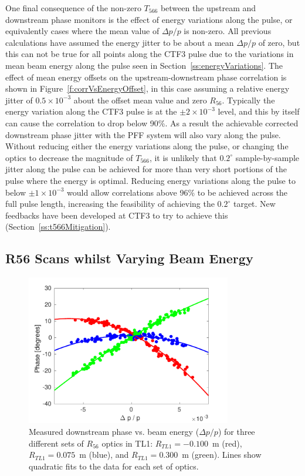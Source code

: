 One final consequence of the non-zero \(T_{566}\) between the upstream and downstream phase monitors is the effect of energy variations along the pulse, or equivalently cases where the mean value of \(\Delta p/p\) is non-zero. All previous calculations have assumed the energy jitter to be about a mean \(\Delta p / p\) of zero, but this can not be true for all points along the CTF3 pulse due to the variations in mean beam energy along the pulse seen in Section~\ref{ss:energyVariations}. The effect of mean energy offsets on the upstream-downstream phase correlation is shown in Figure~\ref{f:corrVsEnergyOffset}, in this case assuming a relative energy jitter of \(0.5\times10^{-3}\) about the offset mean value and zero \(R_{56}\). Typically the energy variation along the CTF3 pulse is at the \(\pm2\times10^{-3}\) level, and this by itself can cause the correlation to drop below 90\%. As a result the achievable corrected downstream phase jitter with the PFF system will also vary along the pulse. Without reducing either the energy variations along the pulse, or changing the optics to decrease the magnitude of \(T_{566}\), it is unlikely that \(0.2^\circ\) sample-by-sample jitter along the pulse can be achieved for more than very short portions of the pulse where the energy is optimal. Reducing energy variations along the pulse to below \(\pm1 \times10^{-3}\) would allow correlations above 96\% to be achieved across the full pulse length, increasing the feasibility of achieving the \(0.2^\circ\) target. New feedbacks have been developed at CTF3 to try to achieve this (Section~\ref{ss:t566Mitigation}).



\subsection{R56 Scans whilst Varying Beam Energy}
\label{ss:r56ScanWithEnergy}


\begin{figure}
  \centering
  \includegraphics[width=0.8\textwidth]{Figures/propagation/R56ScanGunWiggle_PhaseVsEnergy}
  \caption{Measured downstream phase vs. beam energy (\(\Delta p/p\)) for three different sets of \(R_{56}\) optics in TL1: \(R_{TL1}=-0.100\)~m (red), \(R_{TL1}=0.075\)~m (blue), and \(R_{TL1}=0.300\)~m (green). Lines show quadratic fits to the data for each set of optics.}
  \label{f:R56ScanGunWiggle_PhaseVsEnergy}
\end{figure}


